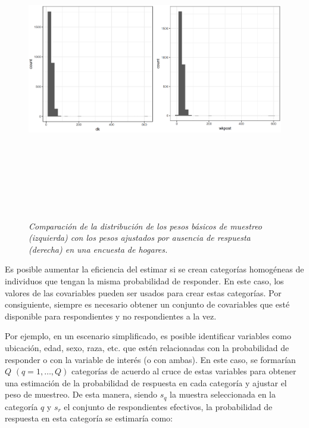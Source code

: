 \documentclass[
  10pt,
  spanish,
]{book}
\begin{document}
\begin{figure}
\centering
\includegraphics[width=\textwidth,height=5.20833in]{Pics/18.png}
\caption{\emph{Comparación de la distribución de los pesos básicos de muestreo (izquierda) con los pesos ajustados por ausencia de respuesta (derecha) en una encuesta de hogares.}}
\end{figure}

Es posible aumentar la eficiencia del estimar si se crean categorías homogéneas de individuos que tengan la misma probabilidad de responder. En este caso, los valores de las covariables pueden ser usados para crear estas categorías. Por consiguiente, siempre es necesario obtener un conjunto de covariables que esté disponible para respondientes y no respondientes a la vez.

Por ejemplo, en un escenario simplificado, es posible identificar variables como ubicación, edad, sexo, raza, etc. que estén relacionadas con la probabilidad de responder o con la variable de interés (o con ambas). En este caso, se formarían \(Q\) \((q = 1, \ldots, Q)\) categorías de acuerdo al cruce de estas variables para obtener una estimación de la probabilidad de respuesta en cada categoría y ajustar el peso de muestreo. De esta manera, siendo \(s_{q}\) la muestra seleccionada en la categoría \(q\) y \(s_r\) el conjunto de respondientes efectivos, la probabilidad de respuesta en esta categoría se estimaría como:
\end{document}

